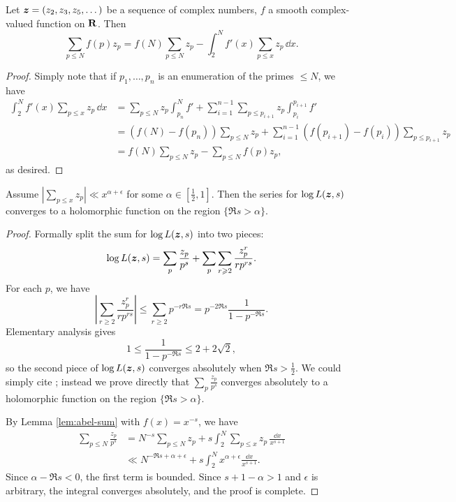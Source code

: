 \begin{lemma}\label{lem:abel-sum}
Let ${\boldsymbol z}=(z_2,z_3,z_5,\dots)$ be a sequence of complex numbers, $f$ a smooth 
complex-valued function on $\mathbf{R}$. Then 
\[
	\sum_{p\leqslant N} f(p) z_p = f(N) \sum_{p\leqslant N} z_p - \int_2^N f'(x) \sum_{p\leqslant x} z_p\, \dd x .
\]
\end{lemma}
\begin{proof}
Simply note that if $p_1,\dots,p_n$ is an enumeration of the primes 
$\leqslant N$, we have 
\begin{align*}
	\int_2^N f'(x) \sum_{p\leqslant x} z_p\, \dd x 
		&= \sum_{p\leqslant N} z_p \int_{p_n}^N f' + \sum_{i=1}^{n-1} \sum_{p\leqslant p_{i+1}} z_p \int_{p_i}^{p_{i+1}} f' \\
		&= (f(N) - f(p_n)) \sum_{p\leqslant N} z_p + \sum_{i=1}^{n-1} (f(p_{i+1}) - f(p_i)) \sum_{p\leqslant p_{i+1}} z_p \\
		&= f(N) \sum_{p\leqslant N} z_p - \sum_{p\leqslant N} f(p) z_p ,
\end{align*}
as desired. 
\end{proof}

\begin{theorem}
Assume $|\sum_{p\leqslant x} z_p| \ll x^{\alpha+\epsilon}$ for some 
$\alpha\in [\frac 1 2,1]$. Then the series for $\log L({\boldsymbol z},s)$ converges to a 
holomorphic function on the region $\{\Re s>\alpha\}$. 
\end{theorem}
\begin{proof}
Formally split the sum for $\log L({\boldsymbol z},s)$ into two pieces: 
\[
	\log L({\boldsymbol z},s) = \sum_p \frac{z_p}{p^s} + \sum_p \sum_{r\geqslant 2} \frac{z_p^r}{r p^{r s}} .
\]
For each $p$, we have 
\[
	\left| \sum_{r\geqslant 2} \frac{z_p^r}{r p^{r s}}\right| \leqslant \sum_{r\geqslant 2} p^{- r \Re s} = p^{-2 \Re s} \frac{1}{1-p^{-\Re s}} .
\]
Elementary analysis gives 
\[
	1 \leqslant \frac{1}{1-p^{-\Re s}} \leqslant 2 + 2\sqrt 2 ,
\]
so the second piece of $\log L({\boldsymbol z},s)$ converges absolutely when 
$\Re s>\frac 1 2$. We could simply cite \cite[II.1 Th.~10]{tenenbaum-1995}; 
instead we prove directly that $\sum_p \frac{z_p}{p^s}$ converges absolutely 
to a holomorphic function on the region $\{\Re s>\alpha\}$. 

By Lemma \ref{lem:abel-sum} with $f(x) = x^{-s}$, we have 
\begin{align*}
	\sum_{p\leqslant N} \frac{z_p}{p^s}
		&= N^{-s} \sum_{p\leqslant N} z_p + s \int_2^N \sum_{p\leqslant x} z_p\, \frac{\dd x}{x^{s+1}} \\
		&\ll N^{-\Re s + \alpha + \epsilon} + s \int_2^N x^{\alpha+\epsilon} \frac{\dd x}{x^{s+1}} .
\end{align*}
Since $\alpha-\Re s < 0$, the first term is bounded. Since $s+1-\alpha > 1$ and 
$\epsilon$ is arbitrary, the integral converges absolutely, and the proof is 
complete. 
\end{proof}

